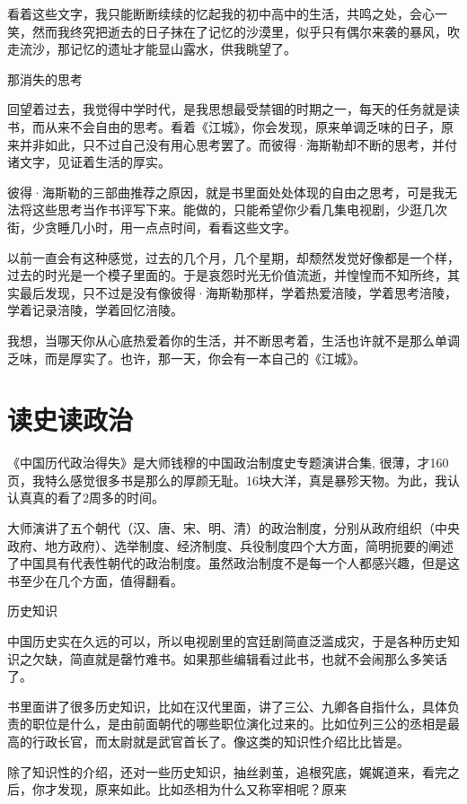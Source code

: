 看着这些文字，我只能断断续续的忆起我的初中高中的生活，共鸣之处，会心一笑，然而我终究把逝去的日子抹在了记忆的沙漠里，似乎只有偶尔来袭的暴风，吹走流沙，那记忆的遗址才能显山露水，供我眺望了。

那消失的思考

回望着过去，我觉得中学时代，是我思想最受禁锢的时期之一，每天的任务就是读书，而从来不会自由的思考。看着《江城》，你会发现，原来单调乏味的日子，原来并非如此，只不过自己没有用心思考罢了。而彼得·海斯勒却不断的思考，并付诸文字，见证着生活的厚实。

彼得·海斯勒的三部曲推荐之原因，就是书里面处处体现的自由之思考，可是我无法将这些思考当作书评写下来。能做的，只能希望你少看几集电视剧，少逛几次街，少贪睡几小时，用一点点时间，看看这些文字。

以前一直会有这种感觉，过去的几个月，几个星期，却颓然发觉好像都是一个样，过去的时光是一个模子里面的。于是哀怨时光无价值流逝，并惶惶而不知所终，其实最后发现，只不过是没有像彼得·海斯勒那样，学着热爱涪陵，学着思考涪陵，学着记录涪陵，学着回忆涪陵。

我想，当哪天你从心底热爱着你的生活，并不断思考着，生活也许就不是那么单调乏味，而是厚实了。也许，那一天，你会有一本自己的《江城》。


\newpage
\section*{读史读政治}


《中国历代政治得失》是大师钱穆的中国政治制度史专题演讲合集, 很薄，才160页，我特么感觉很多书是那么的厚颜无耻。16块大洋，真是暴殄天物。为此，我认认真真的看了2周多的时间。

大师演讲了五个朝代（汉、唐、宋、明、清）的政治制度，分别从政府组织（中央政府、地方政府）、选举制度、经济制度、兵役制度四个大方面，简明扼要的阐述了中国具有代表性朝代的政治制度。虽然政治制度不是每一个人都感兴趣，但是这书至少在几个方面，值得翻看。

历史知识

中国历史实在久远的可以，所以电视剧里的宫廷剧简直泛滥成灾，于是各种历史知识之欠缺，简直就是罄竹难书。如果那些编辑看过此书，也就不会闹那么多笑话了。

书里面讲了很多历史知识，比如在汉代里面，讲了三公、九卿各自指什么，具体负责的职位是什么，是由前面朝代的哪些职位演化过来的。比如位列三公的丞相是最高的行政长官，而太尉就是武官首长了。像这类的知识性介绍比比皆是。

除了知识性的介绍，还对一些历史知识，抽丝剥茧，追根究底，娓娓道来，看完之后，你才发现，原来如此。比如丞相为什么又称宰相呢？原来

